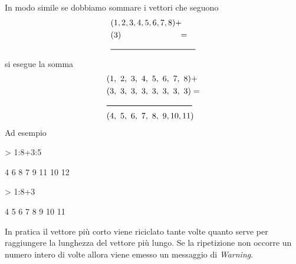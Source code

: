 \documentclass[onecolumn,11pt]{book}
\begin{document}
In modo simile se dobbiamo sommare i vettori che seguono
 \begin{align*} &(1,2,3,4,5,6,7,8)+\\ &(3)\hskip70pt =\\
 &\noindent\rule{0.3\textwidth}{0.6pt}\\
\end{align*}
si esegue la somma
\begin{align}
&(1,~2,~3,~4,~5,~6,~7,~8)+\\
&(3,~3,~3,~3,~3,~3,~3,~3)=\\
&\noindent\rule{0.3\textwidth}{0.8pt} \\
&(4, ~ 5,~  6 ,~ 7,~  8 ,~9, 10,11)\\
\end{align}
Ad esempio
\begin{Schunk}
\begin{Sinput}
> 1:8+3:5
\end{Sinput}
\begin{Soutput}
[1]  4  6  8  7  9 11 10 12
\end{Soutput}
\begin{Sinput}
> 1:8+3
\end{Sinput}
\begin{Soutput}
[1]  4  5  6  7  8  9 10 11
\end{Soutput}
\end{Schunk}
In pratica il vettore pi\`u corto viene riciclato tante volte quanto serve per raggiungere la lunghezza del vettore pi\`u lungo. Se la ripetizione non occorre un numero intero di volte allora viene emesso un messaggio di \textit{Warning}.
\end{document}
